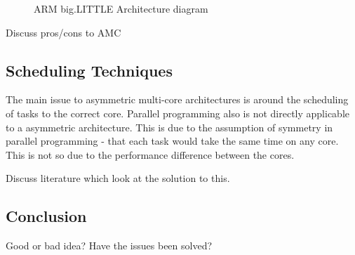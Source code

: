 \begin{figure}
\caption{ARM big.LITTLE Architecture diagram}
\label{fig:bigLITTLE:arch}
\end{figure}

Discuss pros/cons to AMC

\subsection{Scheduling Techniques}

The main issue to asymmetric multi-core architectures is around the scheduling of tasks to the correct core.
Parallel programming also is not directly applicable to a asymmetric architecture. 
This is due to the assumption of symmetry in parallel programming - that each task would take the same time on any core. 
This is not so due to the performance difference between the cores.

Discuss literature which look at the solution to this.

\subsection{Conclusion}

Good or bad idea? Have the issues been solved?



